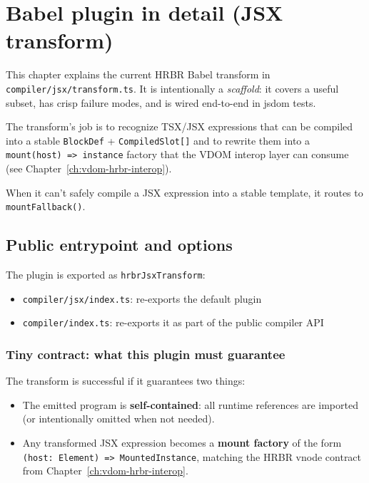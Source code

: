 \chapter{Babel plugin in detail (JSX transform)}
\label{ch:babel-plugin}

This chapter explains the current HRBR Babel transform in \texttt{compiler/jsx/transform.ts}.
It is intentionally a \emph{scaffold}: it covers a useful subset, has crisp failure modes, and is wired end-to-end in jsdom tests.

The transform's job is to recognize TSX/JSX expressions that can be compiled into a stable \texttt{BlockDef} + \texttt{CompiledSlot[]} and to rewrite them into a \texttt{mount(host) => instance} factory that the VDOM interop layer can consume (see Chapter~\ref{ch:vdom-hrbr-interop}).

When it can't safely compile a JSX expression into a stable template, it routes to \texttt{mountFallback()}.

\section{Public entrypoint and options}

The plugin is exported as \texttt{hrbrJsxTransform}:

\begin{itemize}
\item \texttt{compiler/jsx/index.ts}: re-exports the default plugin
\item \texttt{compiler/index.ts}: re-exports it as part of the public compiler API
\end{itemize}

\subsection{Tiny contract: what this plugin must guarantee}

The transform is successful if it guarantees two things:

\begin{itemize}
\item The emitted program is \textbf{self-contained}: all runtime references are imported (or intentionally omitted when not needed).
\item Any transformed JSX expression becomes a \textbf{mount factory} of the form \texttt{(host: Element) => MountedInstance}, matching the HRBR vnode contract from Chapter~\ref{ch:vdom-hrbr-interop}.
\end{itemize}

